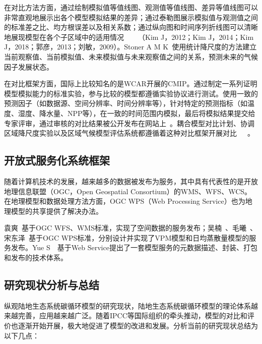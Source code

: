 在对比方法方面，通过绘制模拟值等值线图、观测值等值线图、差异等值线图可以非常直观地展示出各个模型模拟结果的差异；通过泰勒图展示模拟值与观测值之间的标准差之比、均方根误差以及相关系数；通过纵向图和时间序列折线图可以清晰地展现模型在各个子区域中的适用情况~\cite{Kim2013Evaluation}~\cite{Kim2014Evaluation}~\cite{Kim2017Winter}~\cite{刘敏200913}（Kim J，2012；Kim J，2014；Kim J，2018；郭彦，2013；刘敏，2009）。Stoner A M K~\cite{Stoner2013An}使用统计降尺度的方法建立当前观察值、当前模拟值、未来模拟值与未来观察值之间的关系，预测未来的气候因子发展状态。

在对比框架方面，国际上比较知名的是WCAR开展的CMIP。通过制定一系列证明模型模拟能力的标准实验，参与比较的模型都遵循实验协议进行测试。使用一致的预测因子（如数据源、空间分辨率、时间分辨率等），针对特定的预测指标（如温度、湿度、降水量、NPP等），在一致的时间范围内模拟，最后将模拟结果提交给专家评审，通过审核的对比结果被公开发布在网站上~\cite{Taylor2012An}。耦合模型对比计划、协调区域降尺度实验以及区域气候模型评估系统都遵循着这种对比框架开展对比~\cite{eyring2016overview}~\cite{Gutowski2009The}~\cite{赵宗慈2016CMIP6}。


\subsection{开放式服务化系统框架}
随着计算机技术的发展，越来越多的数据被发布为服务，其中具有代表性的是开放地理信息联盟（OGC，Open Geospatial Consortium）的WMS、WFS、WCS。在地理模型和数据处理方法方面，OGC WPS（Web Processing Service）也为地理模型的共享提供了解决办法。 %

袁爽~\cite{袁爽2010空间数据}基于OGC WFS、WMS标准，实现了空间数据的服务发布；吴楠~\cite{吴楠2012基于}、毛曦~\cite{毛曦2012基于}、宋东泽~\cite{宋东泽2015一个生态传感网的}基于OGC WPS标准，分别设计并实现了VPM模型和日均蒸散量模型的服务发布。Yue S~\cite{Yue2013Key}~\cite{Yue2015A}基于Web Service提出了一套模型服务的元数据描述、封装、打包和发布的技术体系。

\subsection{研究现状分析与总结}
纵观陆地生态系统碳循环模型的研究现状，陆地生态系统碳循环模型的理论体系越来越完善，应用越来越广泛。随着IPCC等国际组织的牵头推动，模型的对比和评价也逐渐开始开展，极大地促进了模型的改进和发展。分析当前的研究现状总结为以下几点：

